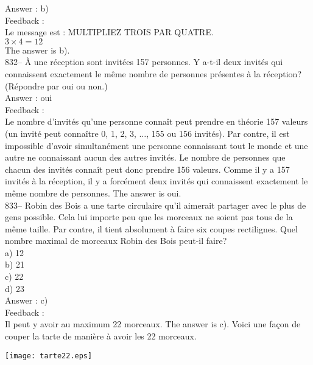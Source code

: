 \documentclass[letterpaper, 12pt]{article}
\begin{document}
Answer : b)\\

Feedback : \\
Le message est : \og MULTIPLIEZ TROIS PAR QUATRE\fg.\\
$3\times4=12$\\
The answer is b).\\


832-- \`A une r\'eception sont invit\'ees 157 personnes.  Y a-t-il deux
invit\'es qui connaissent exactement le m\^eme nombre de personnes
pr\'esentes \`a la r\'eception? (R\'epondre par oui ou non.)\\

Answer : oui\\

Feedback : \\
Le nombre d'invit\'es qu'une personne conna\^it peut prendre en th\'eorie
157 valeurs (un invit\'e peut conna\^itre 0, 1, 2, 3, $\ldots$, 155 ou 156
invit\'es).  Par contre, il est impossible d'avoir simultan\'ement une
personne connaissant tout le monde et une autre ne connaissant aucun des
autres invit\'es.  Le nombre de personnes que chacun des invit\'es conna\^it
peut donc prendre 156 valeurs.  Comme il y a 157 invit\'es \`a la
r\'eception, il y a forc\'ement deux invit\'es qui connaissent exactement le
m\^eme nombre de personnes.  The answer is oui.\\

833-- Robin des Bois a une tarte circulaire qu'il aimerait partager avec le
plus de gens possible.  Cela lui importe peu que les morceaux ne soient pas
tous de la m\^eme taille.  Par contre, il tient absolument \`a faire six
coupes rectilignes.  Quel nombre maximal de morceaux Robin des Bois peut-il
faire?\\
a) 12\\
b) 21\\
c) 22\\
d) 23\\

Answer : c)\\

Feedback : \\
Il peut y avoir au maximum 22 morceaux.  The answer is c).  Voici une
fa\c con de couper la tarte de mani\`ere \`a avoir les 22 morceaux.\\
    \begin{center}
    \texttt{[image: tarte22.eps]}
    \end{center}
\end{document}
